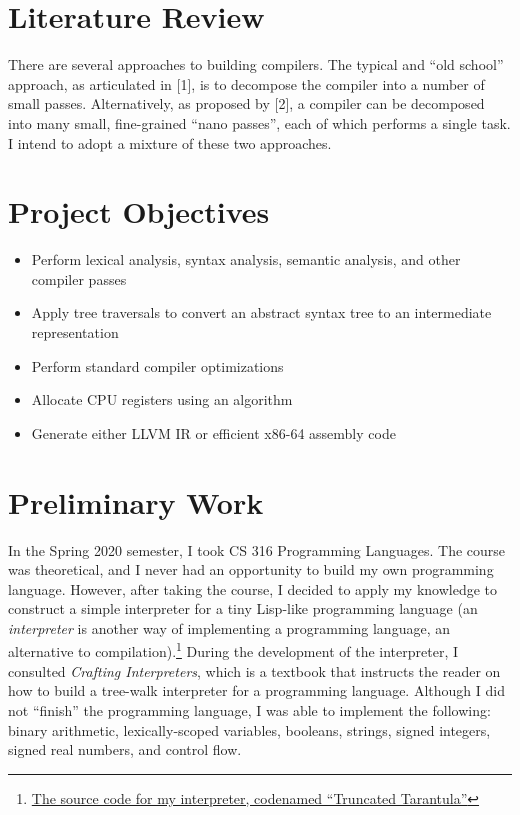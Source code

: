 \documentclass[12pt]{report}
\begin{document}
\section*{{\large Literature Review}}
There are several approaches to building compilers.  The typical and ``old school'' approach, as articulated in [1], is to decompose the compiler into a number of small passes. Alternatively, as proposed by [2], a compiler can be decomposed into many small, fine-grained ``nano passes'', each of which performs a single task.  I intend to adopt a mixture of these two approaches.

\section*{{\large Project Objectives}}
\begin{itemize}
 	\item Perform lexical analysis, syntax analysis, semantic analysis, and other compiler passes
 	\item Apply tree traversals to convert an abstract syntax tree to an intermediate representation
	\item Perform standard compiler optimizations
	\item Allocate CPU registers using an algorithm
	\item Generate either LLVM IR or efficient x86-64 assembly code
\end{itemize}

\section*{{\large Preliminary Work}}
In the Spring 2020 semester, I took CS 316 Programming Languages.  The course was theoretical, and I never had an opportunity to build my own programming language.  However, after taking the course, I decided to apply my knowledge to construct a simple interpreter for a tiny Lisp-like programming language (an \textit{interpreter} is another way of implementing a programming language, an alternative to compilation).\footnote{\href{https://github.com/MatthewKosloski/truncated-tarantula}{The source code for my interpreter, codenamed ``Truncated Tarantula''}}  During the development of the interpreter, I consulted \textit{Crafting Interpreters}, which is a textbook that instructs the reader on how to build a tree-walk interpreter for a programming language.  Although I did not ``finish'' the programming language, I was able to implement the following: binary arithmetic, lexically-scoped variables, booleans, strings, signed integers, signed real numbers, and control flow.
\end{document}
